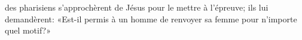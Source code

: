 \encetemps des pharisiens s’approchèrent de Jésus pour le mettre à l’épreuve;
	ils lui demandèrent:
	«Est-il permis à un homme de renvoyer sa femme pour n’importe quel motif?»
